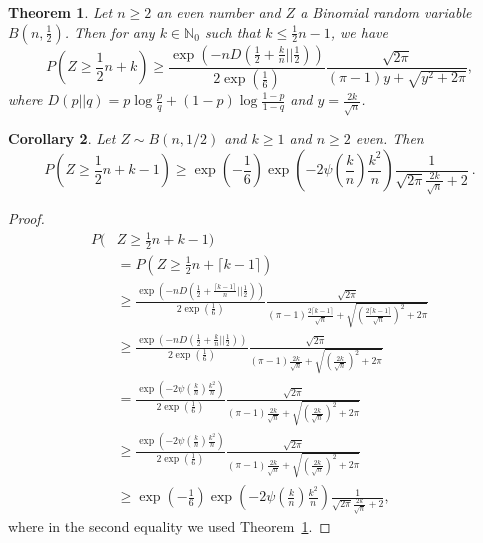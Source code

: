 \documentclass{article}
\newcommand{\field}[1]{\mathbb{#1}}
\newcommand{\Nat}{\field{N}}
\newtheorem{theorem}{Theorem}
\newtheorem{corrollary}[theorem]{Corollary}
\begin{document}
\begin{theorem}
\label{lemma:bin}
Let $n\geq2$ an even number and $Z$ a Binomial random variable $B(n,\frac{1}{2})$. Then for any $k \in \Nat_0$ such that $k\leq \frac{1}{2}n-1$, we have
\[
P\left( Z \geq \frac{1}{2} n + k\right)
\geq  \frac{\exp\left(-n D(\frac{1}{2}+\frac{k}{n}||\frac{1}{2})\right)}{2 \exp\left(\frac{1}{6}\right)} \frac{\sqrt{2 \pi}}{(\pi-1)y+\sqrt{y^2+2 \pi}},
\]
where $D(p||q)=p \log \frac{p}{q}+(1-p) \log\frac{1-p}{1-q}$ and $y=\frac{2 k}{\sqrt{n}}$.
\end{theorem}
%
\begin{corrollary}
Let $Z \sim B(n, 1/2)$ and $k \geq 1$ and $n\geq2$ even. Then
\[
P(Z \geq \frac{1}{2} n + k-1) \geq \exp\left(-\frac{1}{6}\right) \exp\left(- 2 \psi\left(\frac{k}{n}\right) \frac{k^2}{n} \right) \frac{1}{\sqrt{2\pi} \frac{2 k}{\sqrt{n}} + 2 }~.
\]
\end{corrollary}
\begin{proof}
\begin{align*}
P(&Z \geq  \frac{1}{2} n + k-1) \\
& = P(Z\geq \frac{1}{2} n + \lceil k -1\rceil) \\
& \geq \frac{\exp\left(-n D(\frac{1}{2}+\frac{\lceil k -1\rceil}{n}||\frac{1}{2})\right)}{2 \exp\left(\frac{1}{6}\right)} \frac{\sqrt{2 \pi}}{(\pi-1)\frac{2\lceil k -1\rceil}{\sqrt{n}}+\sqrt{\left(\frac{2\lceil k -1\rceil}{\sqrt{n}}\right)^2+2 \pi}} \\
& \geq \frac{\exp\left(-n D(\frac{1}{2}+\frac{k}{n}||\frac{1}{2})\right)}{2 \exp\left(\frac{1}{6}\right)} \frac{\sqrt{2 \pi}}{(\pi-1)\frac{2k}{\sqrt{n}}+\sqrt{\left(\frac{2k}{\sqrt{n}}\right)^2+2 \pi}} \\
& = \frac{\exp\left(- 2 \psi(\frac{k}{n}) \frac{k^2}{n} \right)}{2 \exp\left(\frac{1}{6}\right)} \frac{\sqrt{2 \pi}}{(\pi-1)\frac{2k}{\sqrt{n}}+\sqrt{\left(\frac{2k}{\sqrt{n}}\right)^2+2 \pi}} \\
& \geq \frac{\exp\left(- 2 \psi(\frac{k}{n}) \frac{k^2}{n} \right)}{2 \exp\left(\frac{1}{6}\right)} \frac{\sqrt{2 \pi}}{(\pi-1)\frac{2k}{\sqrt{n}}+\sqrt{\left(\frac{2k}{\sqrt{n}}\right)^2+2 \pi}} \\
& \geq \exp\left(-\frac{1}{6}\right) \exp\left(- 2 \psi\left(\frac{k}{n}\right) \frac{k^2}{n} \right) \frac{1}{\sqrt{2\pi} \frac{2 k}{\sqrt{n}} + 2 },
\end{align*}
where in the second equality we used Theorem~\ref{lemma:bin}.
\end{proof}
\end{document}
